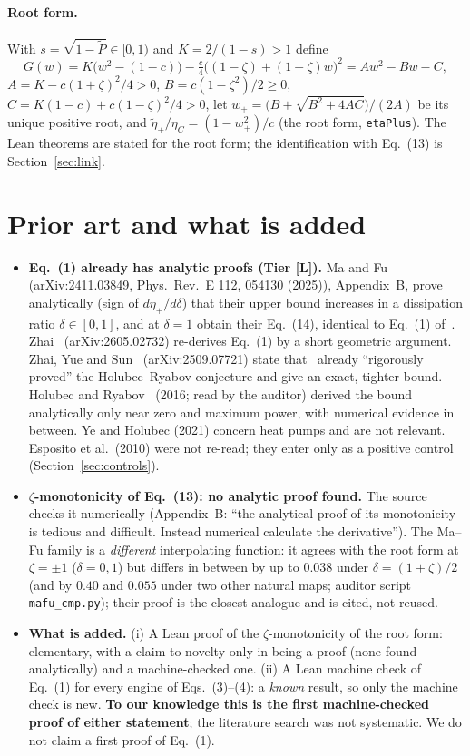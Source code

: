 \documentclass[10pt]{article}
\newcommand{\tier}[1]{\textsf{[#1]}}
\newcommand{\tL}{\tier{L}}
\newcommand{\lean}[1]{\texttt{#1}}
\newcommand{\eC}{\eta_C}
\newcommand{\ep}{\tilde\eta_+}
\theoremstyle{plain}
\begin{document}
\paragraph{Root form.} With $s=\sqrt{1-\tilde P}\in[0,1)$ and $K=2/(1-s)>1$ define
\[
G(w)=K\bigl(w^2-(1-c)\bigr)-\tfrac{c}{4}\bigl((1-\zeta)+(1+\zeta)w\bigr)^2=Aw^2-Bw-C,
\]
$A=K-c(1+\zeta)^2/4>0$, $B=c(1-\zeta^2)/2\ge0$, $C=K(1-c)+c(1-\zeta)^2/4>0$, let $w_+=\bigl(B+\sqrt{B^2+4AC}\bigr)/(2A)$ be its unique positive root, and $\ep/\eC=(1-w_+^2)/c$ (the root form, \lean{etaPlus}). The Lean theorems are stated for the root form; the identification with Eq.~(13) is Section~\ref{sec:link}.

\section{Prior art and what is added}\label{sec:prior}
\begin{itemize}\itemsep=1pt
\item \textbf{Eq.~(1) already has analytic proofs (Tier \tL{}).} Ma and Fu~\cite{mafu} (arXiv:2411.03849, Phys.\ Rev.\ E 112, 054130 (2025)), Appendix~B, prove analytically (sign of $d\tilde\eta_+/d\delta$) that their upper bound increases in a dissipation ratio $\delta\in[0,1]$, and at $\delta=1$ obtain their Eq.~(14), identical to Eq.~(1) of~\cite{ma18}. Zhai~\cite{zhai} (arXiv:2605.02732) re-derives Eq.~(1) by a short geometric argument. Zhai, Yue and Sun~\cite{zys} (arXiv:2509.07721) state that~\cite{ma18} already ``rigorously proved'' the Holubec--Ryabov conjecture and give an exact, tighter bound. Holubec and Ryabov~\cite{hr} (2016; read by the auditor) derived the bound analytically only near zero and maximum power, with numerical evidence in between. Ye and Holubec (2021) concern heat pumps and are not relevant. Esposito et al.\ (2010) were not re-read; they enter only as a positive control (Section~\ref{sec:controls}).
\item \textbf{$\zeta$-monotonicity of Eq.~(13): no analytic proof found.} The source checks it numerically (Appendix~B: ``the analytical proof of its monotonicity is tedious and difficult. Instead numerical calculate the derivative''). The Ma--Fu family is a \emph{different} interpolating function: it agrees with the root form at $\zeta=\pm1$ ($\delta=0,1$) but differs in between by up to $0.038$ under $\delta=(1+\zeta)/2$ (and by $0.40$ and $0.055$ under two other natural maps; auditor script \texttt{mafu\_cmp.py}); their proof is the closest analogue and is cited, not reused.
\item \textbf{What is added.} (i) A Lean proof of the $\zeta$-monotonicity of the root form: elementary, with a claim to novelty only in being a proof (none found analytically) and a machine-checked one. (ii) A Lean machine check of Eq.~(1) for every engine of Eqs.~(3)--(4): a \emph{known} result, so only the machine check is new. \textbf{To our knowledge this is the first machine-checked proof of either statement}; the literature search was not systematic. We do not claim a first proof of Eq.~(1).
\end{itemize}
\end{document}
